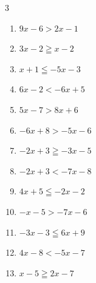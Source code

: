 \begin{multicols}{3}
\begin{enumerate}
  \item $9x-6>2x-1$


  \item $3x-2\geqq x-2$

        \phantom{$\displaystyle x\geqq 0$}

  \item $x+1\leqq -5x-3$


\columnbreak %

\resetques

  \item $6x-2<-6x+5$


  \item $5x-7>8x+6$


  \item $-6x+8>-5x-6$

        \phantom{$\displaystyle x<14$}

  \item $-2x+3\geqq -3x-5$

        \phantom{$\displaystyle x\geqq -8$}

  \item $-2x+3<-7x-8$


  \item $4x+5\leqq -2x-2$


  \item $-x-5>-7x-6$


  \item $-3x-3\leqq 6x+9$


  \item $4x-8<-5x-7$


  \item $x-5\geqq 2x-7$

        \phantom{$\displaystyle x\leqq 2$}


\end{enumerate}
\end{multicols}
